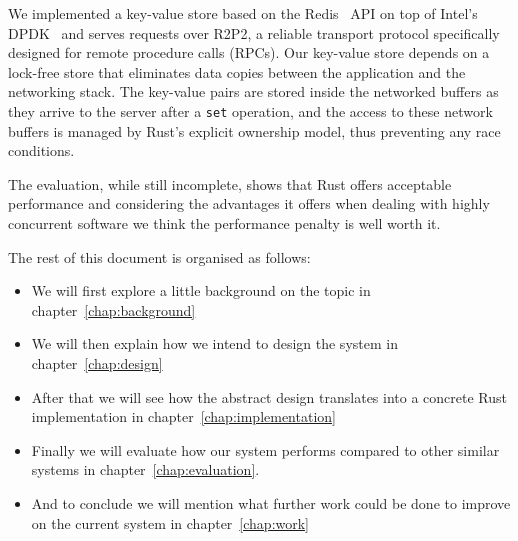We implemented a key-value store based on the Redis~\cite{url:redis}
API on top of Intel's DPDK~\cite{dpdk} and serves requests over R2P2,
a reliable transport protocol specifically designed for remote
procedure calls (RPCs). Our key-value store depends on a lock-free
store that eliminates data copies between the application and the
networking stack. The key-value pairs are stored inside the networked
buffers as they arrive to the server after a \texttt{set} operation,
and the access to these network buffers is managed by Rust's explicit
ownership model, thus preventing any race conditions.

The evaluation, while still incomplete, shows that Rust offers
acceptable performance and considering the advantages it offers when
dealing with highly concurrent software we think the performance
penalty is well worth it.

The rest of this document is organised as follows: %
\begin{itemize}
\item We will first explore a little background on the topic in
  chapter~\ref{chap:background}
\item We will then explain how we intend to design the system in
  chapter~\ref{chap:design}
\item After that we will see how the abstract design translates into a
  concrete Rust implementation in chapter~\ref{chap:implementation}
\item Finally we will evaluate how our system performs compared to
  other similar systems in chapter~\ref{chap:evaluation}.
\item And to conclude we will mention what further work could be done
  to improve on the current system in chapter~\ref{chap:work}
\end{itemize}
